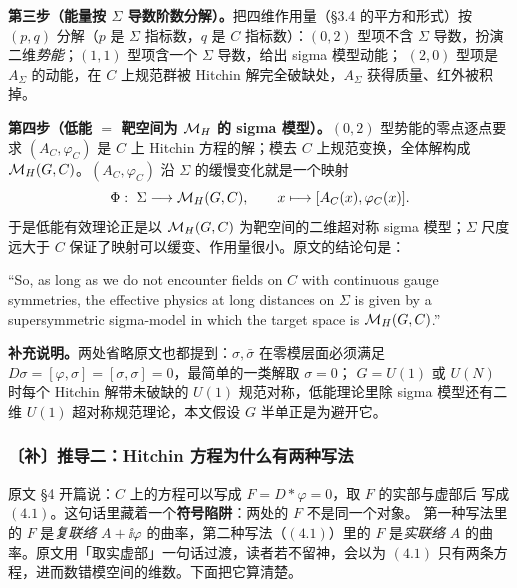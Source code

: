 \textbf{第三步（能量按 $\Sigma$ 导数阶数分解）。}把四维作用量（§3.4 的平方和形式）按
$(p,q)$ 分解（$p$ 是 $\Sigma$ 指标数，$q$ 是 $C$ 指标数）：$(0,2)$ 型项不含 $\Sigma$
导数，扮演二维\emph{势能}；$(1,1)$ 型项含一个 $\Sigma$ 导数，给出 sigma 模型动能；
$(2,0)$ 型项是 $A_\Sigma$ 的动能，在 $C$ 上规范群被 Hitchin 解完全破缺处，$A_\Sigma$
获得质量、红外被积掉。\pA{}

\textbf{第四步（低能 $=$ 靶空间为 $\mathcal{M}_H$ 的 sigma 模型）。}$(0,2)$ 型势能的零点逐点要求
$(A_C,\varphi_C)$ 是 $C$ 上 Hitchin 方程的解；模去 $C$ 上规范变换，全体解构成
$\mathcal{M}_H(G,C)$。$(A_C,\varphi_C)$ 沿 $\Sigma$ 的缓慢变化就是一个映射
\begin{equation}
\Phi:\ \Sigma\longrightarrow \MH(G,C),\qquad x\longmapsto [A_C(x),\varphi_C(x)] .
\label{eq:Phi}
\end{equation}
于是低能有效理论正是以 $\mathcal{M}_H(G,C)$ 为靶空间的二维超对称 sigma 模型；$\Sigma$ 尺度远大于
$C$ 保证了映射可以缓变、作用量很小。原文的结论句是：\pA{}

\begin{origquote}
“So, as long as we do not encounter fields on $C$ with continuous gauge symmetries, the effective physics at long distances on $\Sigma$ is given by a supersymmetric sigma-model in which the target space is $\mathcal{M}_H(G,C)$.” 
\end{origquote}

\textbf{补充说明。}两处省略原文也都提到：$\sigma,\bar\sigma$ 在零模层面必须满足
$D\sigma=[\varphi,\sigma]=[\sigma,\sigma]=0$，最简单的一类解取 $\sigma=0$；
$G=U(1)$ 或 $U(N)$ 时每个 Hitchin 解带未破缺的 $U(1)$ 规范对称，低能理论里除 sigma
模型还有二维 $U(1)$ 超对称规范理论，本文假设 $G$ 半单正是为避开它。\pA{}

\subsubsection*{〔补〕推导二：Hitchin 方程为什么有两种写法}

原文 §4 开篇说：$C$ 上的方程可以写成 $F=D{*}\varphi=0$，取 $F$ 的实部与虚部后
写成 $(4.1)$。这句话里藏着一个\textbf{符号陷阱}：两处的 $F$ 不是同一个对象。
第一种写法里的 $F$ 是\emph{复联络} $A+\ii\varphi$ 的曲率，第二种写法（$(4.1)$）里的
$F$ 是\emph{实联络} $A$ 的曲率。原文用「取实虚部」一句话过渡，读者若不留神，会以为
$(4.1)$ 只有两条方程，进而数错模空间的维数。下面把它算清楚。\pB{}

